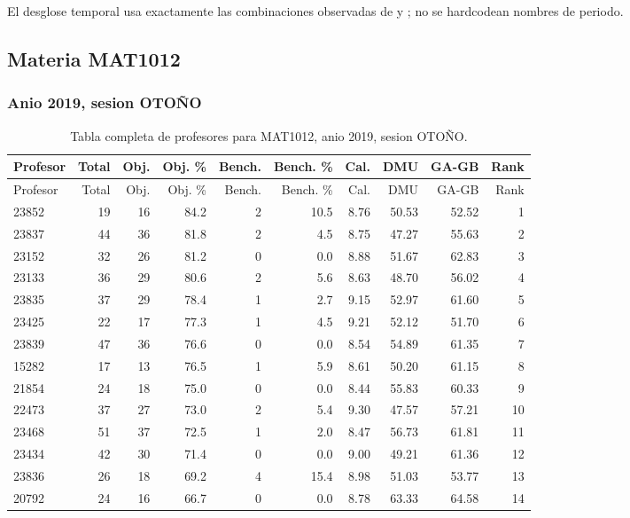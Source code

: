El desglose temporal usa exactamente las combinaciones observadas de  y ; no se hardcodean nombres de periodo.

\subsection{Materia MAT1012}

\subsubsection{Anio 2019, sesion OTOÑO}

\begingroup
\scriptsize
\setlength{\tabcolsep}{3pt}
\begin{longtable}{lrrrrrrrrr}
\caption{Tabla completa de profesores para MAT1012, anio 2019, sesion OTOÑO.}\label{tab:prof-period-mat1012-2019-oto-o}\\
\toprule
Profesor & Total & Obj. & Obj. \% & Bench. & Bench. \% & Cal. & DMU & GA-GB & Rank \\
\midrule
\endfirsthead
\toprule
Profesor & Total & Obj. & Obj. \% & Bench. & Bench. \% & Cal. & DMU & GA-GB & Rank \\
\midrule
\endhead
23852 & 19 & 16 & 84.2 & 2 & 10.5 & 8.76 & 50.53 & 52.52 & 1 \\
23837 & 44 & 36 & 81.8 & 2 & 4.5 & 8.75 & 47.27 & 55.63 & 2 \\
23152 & 32 & 26 & 81.2 & 0 & 0.0 & 8.88 & 51.67 & 62.83 & 3 \\
23133 & 36 & 29 & 80.6 & 2 & 5.6 & 8.63 & 48.70 & 56.02 & 4 \\
23835 & 37 & 29 & 78.4 & 1 & 2.7 & 9.15 & 52.97 & 61.60 & 5 \\
23425 & 22 & 17 & 77.3 & 1 & 4.5 & 9.21 & 52.12 & 51.70 & 6 \\
23839 & 47 & 36 & 76.6 & 0 & 0.0 & 8.54 & 54.89 & 61.35 & 7 \\
15282 & 17 & 13 & 76.5 & 1 & 5.9 & 8.61 & 50.20 & 61.15 & 8 \\
21854 & 24 & 18 & 75.0 & 0 & 0.0 & 8.44 & 55.83 & 60.33 & 9 \\
22473 & 37 & 27 & 73.0 & 2 & 5.4 & 9.30 & 47.57 & 57.21 & 10 \\
23468 & 51 & 37 & 72.5 & 1 & 2.0 & 8.47 & 56.73 & 61.81 & 11 \\
23434 & 42 & 30 & 71.4 & 0 & 0.0 & 9.00 & 49.21 & 61.36 & 12 \\
23836 & 26 & 18 & 69.2 & 4 & 15.4 & 8.98 & 51.03 & 53.77 & 13 \\
20792 & 24 & 16 & 66.7 & 0 & 0.0 & 8.78 & 63.33 & 64.58 & 14 \\

\end{longtable}
